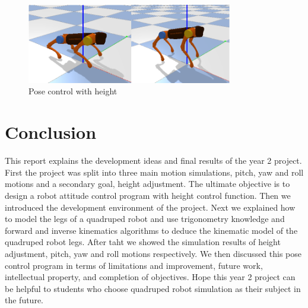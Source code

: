 \begin{figure}[htbp]
   \centering
   \includegraphics[width=0.8\textwidth]{figures/Pose_control_with_height.png}
   \caption{Pose control with height}
   \label{fig: Pose_control_with_height}
\end{figure}

\chapter{Conclusion}

This report explains the development ideas and final results of the year 2 project. First the project was split into three main motion simulations, pitch, yaw and roll motions and a secondary goal, height adjustment. The ultimate objective is to design a robot attitude control program with height control function. Then we introduced the development environment of the project. Next we explained how to model the legs of a quadruped robot and use trigonometry knowledge and forward and inverse kinematics algorithms to deduce the kinematic model of the quadruped robot legs. After taht we showed the simulation results of height adjustment, pitch, yaw and roll motions respectively. We then discussed this pose control program in terms of limitations and improvement, future work, intellectual property, and completion of objectives. Hope this year 2 project can be helpful to students who choose quadruped robot simulation as their subject in the future.
